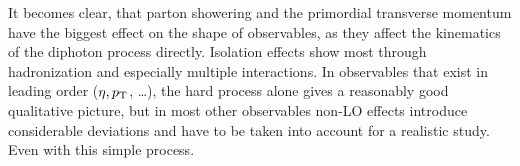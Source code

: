 It becomes clear, that parton showering and the primordial transverse
momentum have the biggest effect on the shape of observables, as they
affect the kinematics of the diphoton process directly. Isolation
effects show most through hadronization and especially multiple
interactions. In observables that exist in leading order
(\(\eta, p_\mathrm{T}\), \ldots), the hard process alone gives a reasonably
good qualitative picture, but in most other observables non-LO effects
introduce considerable deviations and have to be taken into account
for a realistic study. Even with this simple process.

